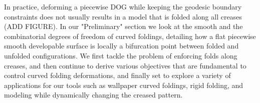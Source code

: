 In practice, deforming a piecewise DOG while keeping the geodesic boundary constraints does not usually results in a model that is folded along all creases (ADD FIGURE). In our "Preliminary" section we look at the smooth and the combinatorial degrees of freedom of curved foldings, detailing how a flat piecewise smooth developable surface is locally a bifurcation point between folded and unfolded configurations. We first tackle the problem of enforcing folds along creases, and then continue to derive various objectives that are fundamental to control curved folding deformations, and finally set to explore a variety of applications for our tools such as wallpaper curved foldings, rigid folding, and modeling while dynamically changing the creased pattern.






